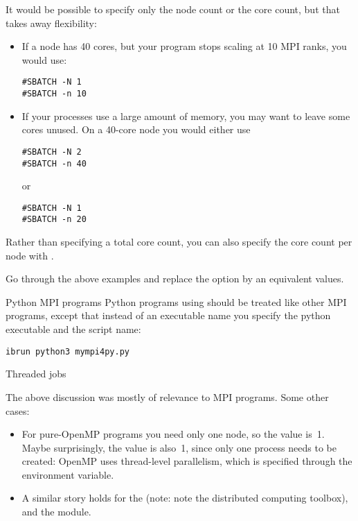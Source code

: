 It would be possible to specify only the node count or the core count,
but that takes away flexibility:
\begin{itemize}
\item If a node has 40 cores, but your program stops scaling at  10 MPI ranks,
  you would use:
\begin{verbatim}
#SBATCH -N 1
#SBATCH -n 10
\end{verbatim}
\item If your processes use a large amount of memory, you may want to leave some cores unused.
  On a 40-core node you would either use
\begin{verbatim}
#SBATCH -N 2
#SBATCH -n 40
\end{verbatim}
or 
\begin{verbatim}
#SBATCH -N 1
#SBATCH -n 20
\end{verbatim}
\end{itemize}

Rather than specifying a total core count, you can also specify the core count
per node with .

\begin{exercise}
  Go through the above examples and replace the  option by an equivalent
   values.
\end{exercise}

\begin{pythonnote}{Python MPI programs}
  Python programs using  should be treated like other
  MPI programs, except that instead of an executable name you specify
  the python executable and the script name:
\begin{verbatim}
ibrun python3 mympi4py.py
\end{verbatim}
\end{pythonnote}

 {Threaded jobs}

The above discussion was mostly of relevance to MPI programs.
Some other cases:
\begin{itemize}
\item For pure-OpenMP programs you need only one node, so the  value is~1.
  Maybe surprisingly, the  value is also~1, since only one process needs
  to be created: OpenMP uses thread-level parallelism, which is specified
  through the  environment variable.
\item A similar story holds for the
  (note: note the distributed computing toolbox),
  and the  module.
\end{itemize}


